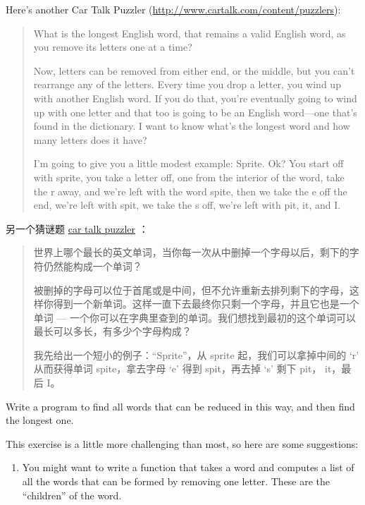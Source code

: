\begin{exercise}

Here's another Car Talk Puzzler
(\url{http://www.cartalk.com/content/puzzlers}):

\begin{quote}
What is the longest English word, that remains a valid English word,
as you remove its letters one at a time?

Now, letters can be removed from either end, or the middle, but you
can't rearrange any of the letters. Every time you drop a letter, you
wind up with another English word. If you do that, you're eventually
going to wind up with one letter and that too is going to be an
English word---one that's found in the dictionary. I want to know
what's the longest word and how many letters does it
have?

I'm going to give you a little modest example: Sprite. Ok? You start
off with sprite, you take a letter off, one from the interior of the
word, take the r away, and we're left with the word spite, then we
take the e off the end, we're left with spit, we take the s off, we're
left with pit, it, and I.
\end{quote}

另一个猜谜题 \href{http://www.cartalk.com/content/puzzlers}{car talk puzzler} ：

\begin{quote}
世界上哪个最长的英文单词，当你每一次从中删掉一个字母以后，剩下的字符仍然能构成一个单词？

被删掉的字母可以位于首尾或是中间，但不允许重新去排列剩下的字母，这样你得到一个新单词。这样一直下去最终你只剩一个字母，并且它也是一个单词 --- 一个你可以在字典里查到的单词。我们想找到最初的这个单词可以最长可以多长，有多少个字母构成？

我先给出一个短小的例子：``Sprite''，从 sprite 起，我们可以拿掉中间的 `r' 从而获得单词 spite，拿去字母 `e' 得到 spit，再去掉 `s' 剩下 pit， it，最后 I。
\end{quote}
 

Write a program to find all words that can be reduced in this way,
and then find the longest one.

This exercise is a little more challenging than most, so here are
some suggestions:

\begin{enumerate}

\item You might want to write a function that takes a word and
  computes a list of all the words that can be formed by removing one
  letter.  These are the ``children'' of the word.


\end{enumerate}
\end{exercise}
